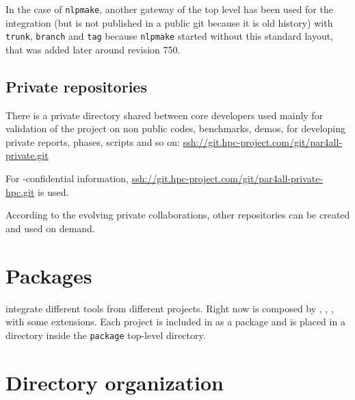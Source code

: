 \documentclass[a4paper]{article}
\begin{document}
In the case of \texttt{nlpmake}, another \Agit{} \Asvn gateway of the top
level has been used for the integration (but is not published in a public
git because it is old history) with \texttt{trunk}, \texttt{branch} and
\texttt{tag} because \texttt{nlpmake} started without this standard
layout, that was added later around revision 750.


\subsection{Private repositories}
\label{sec:private-repositories}

There is a private directory shared between core developers used mainly
for validation of the project on non public codes, benchmarks, demos, for
developing private reports, phases, scripts and so on:
\url{ssh://git.hpc-project.com/git/par4all-private.git}

For \Ahpcp-confidential information,
\url{ssh://git.hpc-project.com/git/par4all-private-hpc.git} is used.

According to the evolving private collaborations, other repositories can
be created and used on demand.


\section{Packages}
\label{sec:packages}

\Apfa integrate different tools from different projects. Right now \Apfa
is composed by \Apips, \Apipsgfc, \Apolylib, with some extensions. Each
project is included in \Apfa as a package and is placed in a directory
inside the \texttt{package} top-level directory.


\section{Directory organization}
\label{sec:direct-organ}
\end{document}
